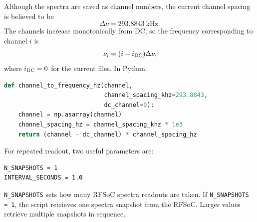 \documentclass[12pt]{extarticle}
\begin{document}
Although the spectra are saved as channel numbers, the current channel spacing is believed to be
\[
\Delta \nu = 293.8843~\mathrm{kHz}.
\]
The channels increase monotonically from DC, so the frequency corresponding to channel $i$ is
\begin{equation}
\nu_i = (i - i_{\rm DC})\Delta \nu,
\end{equation}
where $i_{\rm DC}=0$ for the current files. In Python:
\begin{lstlisting}[language=Python]
def channel_to_frequency_hz(channel,
                            channel_spacing_khz=293.8843,
                            dc_channel=0):
    channel = np.asarray(channel)
    channel_spacing_hz = channel_spacing_khz * 1e3
    return (channel - dc_channel) * channel_spacing_hz
\end{lstlisting}

\noindent For repeated readout, two useful parameters are:
\begin{lstlisting}
N_SNAPSHOTS = 1
INTERVAL_SECONDS = 1.0
\end{lstlisting}

\noindent \texttt{N\_SNAPSHOTS} sets how many RFSoC spectra readouts are taken. If \texttt{N\_SNAPSHOTS = 1}, the script retrieves one spectra snapshot from the RFSoC. Larger values retrieve multiple snapshots in sequence.
\end{document}
